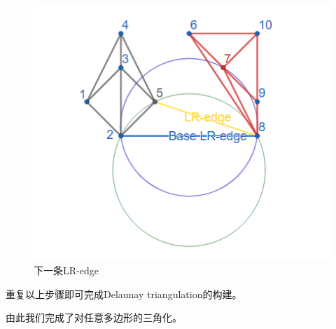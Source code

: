 \begin{figure}[htbp]
\begin{minipage}{0.32\textwidth}
        \includegraphics[width=\textwidth]
        {figures/DT8.png}
        \caption{下一条LR-edge}
    \end{minipage}
\end{figure}



重复以上步骤即可完成Delaunay triangulation的构建。

由此我们完成了对任意多边形的三角化。



